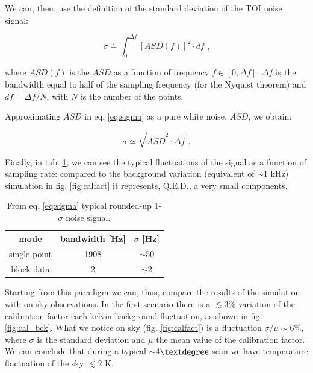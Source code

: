 \documentclass[twocolumn,traditabstract]{aa}\\
\begin{document}
\noindent  We can, then, use the definition of the standard deviation of the TOI noise signal:

\begin{equation}
\sigma \doteq \int_{0}^{\Delta f} \left[ASD(f) \right]^2\cdot df \text{ ,}
\label{eq:sigma}
\end{equation}

\noindent where $ASD(f)$ is the $ASD$ as a function of frequency $f\in[0,\Delta f]$, $\Delta f$ is the bandwidth equal to half of the sampling frequency (for the Nyquist theorem) and $df\doteq\Delta f/N$, with $N$ is the number of the points.

\noindent Approximating $ASD$ in eq. \ref{eq:sigma} as a pure white noise, $\tilde{ASD}$, we obtain:

\begin{equation}
\sigma\simeq \sqrt{ \tilde{ASD}^2 \cdot \Delta f } \text{ ,}
\end{equation}

\noindent Finally, in tab. \ref{tab:sigma_sig}, we can see the typical fluctuations of the signal as a function of sampling rate: compared to the background variation (equivalent of $\sim 1$ kHz) simulation in fig. \ref{fig:calfact} it represents, Q.E.D., a very small components.

\begin{table}[htf]
	\footnotesize
	\centering
	\caption{From eq. \ref{eq:sigma} typical rounded-up 1-$\sigma$ noise signal.}
	\begin{tabular}{ccc}
		\toprule
		\textbf{mode} & \textbf{bandwidth [Hz]} & \textbf{$\sigma$ [Hz]} \\
		\toprule
		single point & 1908 & $\sim$50 \\ 
		\midrule 
		block data & 2 & $\sim$2 \\ 
		\bottomrule
	\end{tabular}
	\label{tab:sigma_sig}
\end{table}

Starting from this paradigm we can, thus, compare the results of the simulation with on sky observations. In the first scenario there is a $\lesssim 3\%$ variation of the calibration factor each kelvin background fluctuation, as shown in fig. \ref{fig:cal_bck}. What we notice on sky (fig. \ref{fig:calfact}) is a fluctuation $\sigma/\mu\sim6\%$, where $\sigma$ is the standard deviation and $\mu$ the mean value of the calibration factor. We can conclude that during a typical $\sim$4$\textdegree$ scan we have temperature fluctuation of the sky $\lesssim 2$ K.
\end{document}
